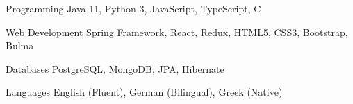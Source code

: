 


\begin{cvskills}


\cvskill
{Programming} %
{Java 11, Python 3, JavaScript, TypeScript, C} %


\cvskill
{Web Development} %
{Spring Framework, React, Redux, HTML5, CSS3, Bootstrap, Bulma} %


\cvskill
{Databases} %
{PostgreSQL, MongoDB, JPA, Hibernate} %


\cvskill
{Languages} %
{English (Fluent), German (Bilingual), Greek (Native)} %


\end{cvskills}